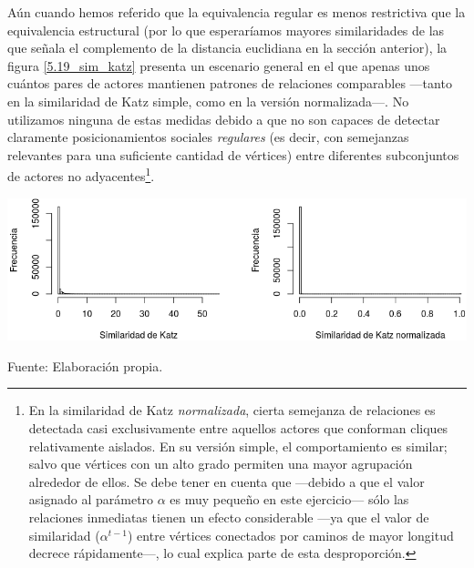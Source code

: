 \documentclass[letterpaper, 11pt]{book}
\theoremstyle{definition}
\theoremstyle{remark}
\begin{document}
Aún cuando hemos referido que la equivalencia regular es menos restrictiva que la equivalencia estructural (por lo que esperaríamos mayores similaridades de las que señala el complemento de la distancia euclidiana en la sección anterior), la figura \ref{5.19_sim_katz} presenta un escenario general en el que apenas unos cuántos pares de actores mantienen patrones de relaciones comparables ---tanto en la similaridad de Katz simple, como en la versión normalizada---. 
No utilizamos ninguna de estas medidas debido a que no son capaces de detectar claramente posicionamientos sociales \emph{regulares} (es decir, con semejanzas relevantes para una suficiente cantidad de vértices) entre diferentes subconjuntos de actores no adyacentes\footnote{
    En la similaridad de Katz \emph{normalizada}, cierta semejanza de relaciones es detectada casi exclusivamente entre aquellos actores que conforman cliques relativamente aislados. 
    En su versión simple, el comportamiento es similar; salvo que vértices con un alto grado permiten una mayor agrupación alrededor de ellos. 
    Se debe tener en cuenta que ---debido a que el valor asignado al parámetro $\alpha$ es muy pequeño en este ejercicio--- sólo las relaciones inmediatas tienen un efecto considerable ---ya que el valor de similaridad ($\alpha^{t-1}$) entre vértices conectados por caminos de mayor longitud decrece rápidamente---, lo cual explica parte de esta desproporción.
}. 


\hspace{-1em}\begin{minipage}{\linewidth}
\centering
{} \label{5.19_sim_katz}
\hspace{-1em}\includegraphics[scale=0.75]{img/5.19_sim_katz.png}
\par\bigskip
\small Fuente: Elaboración propia. 
\end{minipage}\bigskip
\end{document}
